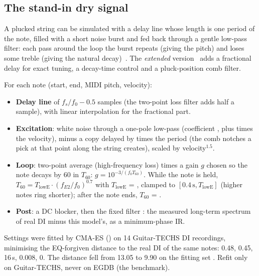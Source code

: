 \subsection{The stand-in dry signal}
\label{sec:impl-dry}

\begin{keyidea}
A plucked string can be simulated with a delay line whose length is one period
of the note, filled with a short noise burst and fed back through a gentle
low-pass filter: each pass around the loop the burst repeats (giving the pitch)
and loses some treble (giving the natural decay)~\cite{karplus1983digital}. The
\emph{extended} version~\cite{jaffe1983extensions} adds a fractional delay for
exact tuning, a decay-time control and a pluck-position comb filter.
\end{keyidea}

\begin{inapp}
For each note (start, end, MIDI pitch, velocity):
\begin{itemize}
\item \textbf{Delay line} of $f_s/f_0 - 0.5$ samples (the two-point loss filter
  adds half a sample), with linear interpolation for the fractional part.
\item \textbf{Excitation}: white noise through a one-pole low-pass (coefficient
  , plus  times the velocity), minus a
  copy delayed by  times the period (the comb notches a pick
  at that point along the string creates), scaled by velocity$^{1.5}$.
\item \textbf{Loop}: two-point average (high-frequency loss) times a gain $g$
  chosen so the note decays by 60\dB{} in $T_{60}$:
  $g = 10^{-3/(f_0 T_{60})}$. While the note is held,
  $T_{60} = T_{\mathrm{lowE}}\cdot(f_{E2}/f_0)^{0.7}$ with $T_{\mathrm{lowE}}$ = , clamped to
  $[0.4\,\text{s}, T_{\mathrm{lowE}}]$ (higher notes ring shorter); after the note
  ends, $T_{60}$ = .
\item \textbf{Post}: a DC blocker, then the fixed filter : the
  measured long-term spectrum of real DI minus this model's, as a minimum-phase
  IR.
\end{itemize}
Settings were fitted by CMA-ES () on 14 Guitar-TECHS DI
recordings, minimising the EQ-forgiven distance to the real DI of the same
notes:  0.48,  0.45,  16\,s,
 0.008,  0. The distance fell from
13.05 to 9.90\dB{} on the fitting set \measured. Refit only on Guitar-TECHS,
never on EGDB (the benchmark).
\end{inapp}

